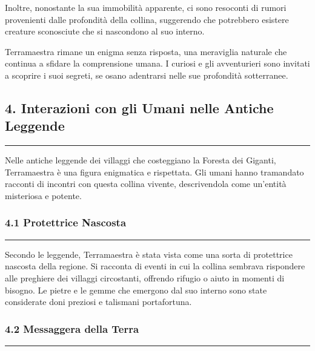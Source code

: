 Inoltre, nonostante la sua immobilità apparente, ci sono resoconti di
rumori provenienti dalle profondità della collina, suggerendo che
potrebbero esistere creature sconosciute che si nascondono al suo
interno.

Terramaestra rimane un enigma senza risposta, una meraviglia naturale
che continua a sfidare la comprensione umana. I curiosi e gli
avventurieri sono invitati a scoprire i suoi segreti, se osano
adentrarsi nelle sue profondità sotterranee.

\subsection{\texorpdfstring{4. Interazioni con gli Umani \textbf{nelle
Antiche
Leggende}}{4. Interazioni con gli Umani nelle Antiche Leggende}}\label{interazioni-con-gli-umani-nelle-antiche-leggende}

\begin{center}\rule{0.5\linewidth}{0.5pt}\end{center}

Nelle antiche leggende dei villaggi che costeggiano la Foresta dei
Giganti, Terramaestra è una figura enigmatica e rispettata. Gli umani
hanno tramandato racconti di incontri con questa collina vivente,
descrivendola come un'entità misteriosa e potente.

\subsubsection{4.1 Protettrice Nascosta}\label{protettrice-nascosta}

\begin{center}\rule{0.5\linewidth}{0.5pt}\end{center}

Secondo le leggende, Terramaestra è stata vista come una sorta di
protettrice nascosta della regione. Si racconta di eventi in cui la
collina sembrava rispondere alle preghiere dei villaggi circostanti,
offrendo rifugio o aiuto in momenti di bisogno. Le pietre e le gemme che
emergono dal suo interno sono state considerate doni preziosi e
talismani portafortuna.

\subsubsection{4.2 Messaggera della Terra}\label{messaggera-della-terra}

\begin{center}\rule{0.5\linewidth}{0.5pt}\end{center}

